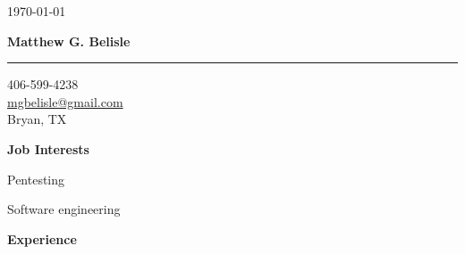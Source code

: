 \documentclass[10pt, a4paper]{article}
\begin{document}
\thispagestyle{empty}
\begin{flushright}
\small \today
\end{flushright}
\begin{center}
\textbf{\Large Matthew G. Belisle}
\rule{\linewidth}{0.5mm}
\end{center}
\begin{flushright}
\begin{minipage}[h]{0.25\linewidth}\small
\begin{flushleft}
406-599-4238\\
\href{mailto:mgbelisle@gmail.com}{mgbelisle@gmail.com}\\
Bryan, TX
\end{flushleft}
\end{minipage}
\end{flushright}
\textbf{Job Interests}
\begin{itemize*}
  \item Pentesting
  \item Software engineering
\end{itemize*}
\textbf{Experience}
\end{document}
